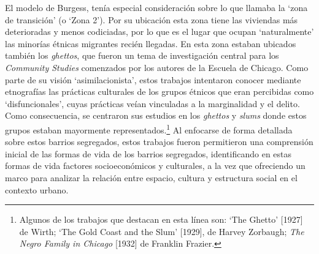 \documentclass[
  spanish,
  a4paper,%
  chapterprefix=true,%
  DIV=calc,%
  twoside]{scrbook}%
\begin{document}
El modelo de Burgess, tenía especial consideración sobre lo que llamaba
la `zona de transición' (o `Zona 2'). Por su ubicación esta zona tiene
las viviendas más deterioradas y menos codiciadas, por lo que es el
lugar que ocupan `naturalmente' las minorías étnicas migrantes recién
llegadas. En esta zona estaban ubicados también los \emph{ghettos}, que
fueron un tema de investigación central para los \emph{Community Studies}
comenzados por los autores de la Escuela de Chicago. Como parte de su
visión `asimilacionista', estos trabajos intentaron conocer mediante
etnografías las prácticas culturales de los grupos étnicos que eran
percibidas como `disfuncionales', cuyas prácticas veían vinculadas a la
marginalidad y el delito. Como consecuencia, se centraron sus estudios
en los \emph{ghettos} y \emph{slums} donde estos grupos estaban mayormente
representados.\footnote{Algunos de los trabajos que destacan en esta línea
  son: `The Ghet­to' {[}1927{]} de Wirth; `The Gold Coast and the Slum'
  {[}1929{]}, de Harvey Zorbaugh; \emph{The Negro Family in Chicago} {[}1932{]} de
  Franklin Frazier.} Al enfocarse de forma detallada sobre
estos barrios segregados, estos trabajos fueron permitieron una
comprensión inicial de las formas de vida de los barrios segregados,
identificando en estas formas de vida factores socioeconómicos y
culturales, a la vez que ofreciendo un marco para analizar la relación
entre espacio, cultura y estructura social en el contexto urbano.
\end{document}
